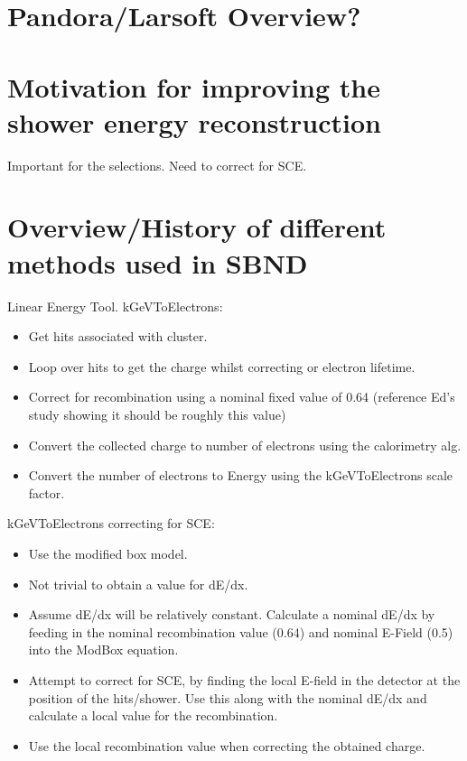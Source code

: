 \section{Pandora/Larsoft Overview?}

\section{Motivation for improving the shower energy reconstruction}
Important for the selections. 
Need to correct for SCE.
\section{Overview/History of different methods used in SBND}
Linear Energy Tool. \newline
kGeVToElectrons:
\begin{itemize}
    \item Get hits associated with cluster.
    \item Loop over hits to get the charge whilst correcting or electron lifetime.
    \item Correct for recombination using a nominal fixed value of 0.64 (reference Ed's study showing it should be roughly this value) 
    \item Convert the collected charge to number of electrons using the calorimetry alg.
    \item Convert the number of electrons to Energy using the kGeVToElectrons scale factor. 
\end{itemize}
kGeVToElectrons correcting for SCE:
\begin{itemize}
    \item Use the modified box model.
    \item Not trivial to obtain a value for dE/dx.
    \item Assume dE/dx will be relatively constant. Calculate a nominal dE/dx by feeding in the nominal recombination value (0.64) and nominal E-Field (0.5) into the ModBox equation. 
    \item Attempt to correct for SCE, by finding the local E-field in the detector at the position of the hits/shower. Use this along with the nominal dE/dx and calculate a local value for the recombination. 
    \item Use the local recombination value when correcting the obtained charge. 
\end{itemize}

